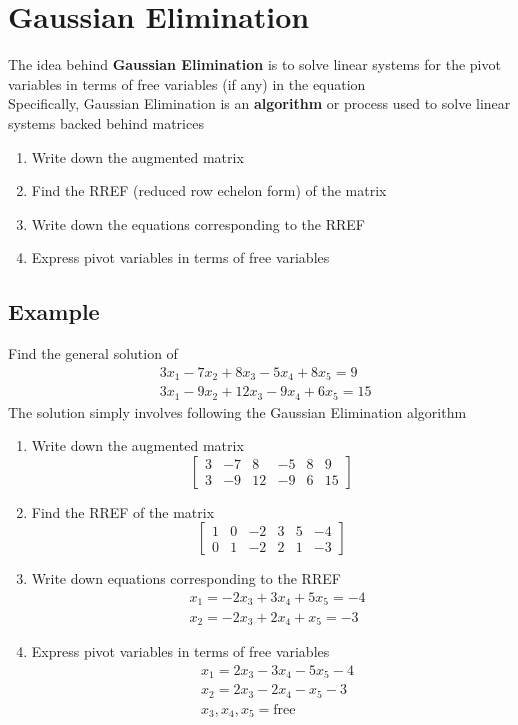 \section{Gaussian Elimination}
The idea behind \textbf{Gaussian Elimination} is to solve linear systems
for the pivot variables in terms of free variables (if any) in the equation
\\
Specifically, Gaussian Elimination is an \textbf{algorithm} or process used
to solve linear systems backed behind matrices
\begin{enumerate}
  \item Write down the augmented matrix
  \item Find the RREF (reduced row echelon form) of the matrix
  \item Write down the equations corresponding to the RREF
  \item Express pivot variables in terms of free variables
\end{enumerate}
\subsection{Example}
Find the general solution of
\[
\begin{aligned}
  &3x_1 - 7x_2 + 8x_3 - 5x_4 + 8x_5 = 9 \\
  &3x_1 - 9x_2 + 12x_3 - 9x_4 + 6x_5 = 15
\end{aligned}
\]
The solution simply involves following the Gaussian Elimination algorithm
\begin{enumerate}
  \item Write down the augmented matrix
    \[
    \left[
      \begin{array}{ccccc|c}
        3 & -7 & 8 & -5 & 8 & 9 \\
        3 & -9 & 12 & -9 & 6 & 15
      \end{array}
    \right]
    \]
  \item Find the RREF of the matrix
    \[
    \left[
      \begin{array}{ccccc|c}
        1 & 0 & -2 & 3 & 5 & -4 \\
        0 & 1 & -2 & 2 & 1 & -3
      \end{array}
    \right]
    \]
  \item Write down equations corresponding to the RREF
    \[
      \begin{aligned}
        &x_1 = -2x_3 + 3x_4 + 5x_5 = -4 \\
        &x_2 = -2x_3 + 2x_4 + x_5 = -3
      \end{aligned}
    \] 
  \item Express pivot variables in terms of free variables
    \[
      \begin{aligned}
        &x_1 = 2x_3 - 3x_4 - 5x_5 - 4 \\
        &x_2 = 2x_3 - 2x_4 - x_5 - 3 \\
        &x_3, x_4, x_5 = \text{free}
      \end{aligned}
    \]
\end{enumerate}
